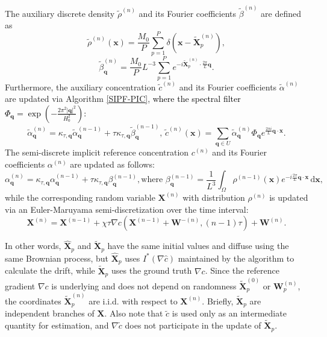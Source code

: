 \documentclass[review,onefignum,onetabnum]{siamart250211}
\begin{document}
\begin{definition}
The auxiliary discrete density \( \tilde{\rho}^{(n)} \) and its Fourier coefficients $\tilde{\beta}^{(n)}$ are defined as 
\begin{equation}
\tilde{\rho}^{(n)}(\mathbf{x}) = \frac{M_0}{P} \sum\limits_{p=1}^{P} \delta(\mathbf{x} - \widetilde{\mathbf{X}}_p^{(n)}),
\end{equation}
\begin{equation}
\tilde{\beta}_\mathbf{q}^{(n)} = \frac{M_0}{P} L^{-3} \sum_{p=1}^P e^{-i \widetilde{\mathbf{X}}_p^{(n)} \cdot \frac{2\pi}{L} \mathbf{q}}.
\end{equation}
Furthermore, the auxiliary concentration $\tilde{c}^{(n)}$ and its Fourier coefficients $\tilde{\alpha}^{(n)}$ are updated via Algorithm \ref{SIPF-PIC}, \textcolor{black}{where the spectral filter $\Phi_{\mathbf q}=\exp\left(-\frac{2\pi ^2|\mathbf q|^2}{H_0^2}\right)$:}
\begin{equation}
\label{eq:alpha_tilde_update}
\tilde{\alpha}^{(n)}_{\mathbf{q}} = \kappa_{\tau,\mathbf q} \tilde{\alpha}^{(n-1)}_{\mathbf{q}} + \tau \kappa_{\tau,\mathbf q} \tilde{\beta}^{(n-1)}_{\mathbf{q}},\,
\tilde{c}^{(n)} (\mathbf{x})  = \sum_{\mathbf{q} \in U}  \tilde{\alpha}_{\mathbf{q}}^{(n)} \Phi_{\mathbf q} e^{ \frac{2\pi i}{L} \mathbf{q} \cdot \mathbf{x}}.
\end{equation}
The semi-discrete implicit reference concentration $c^{(n)}$ and its Fourier coefficients $\alpha^{(n)}$ are updated as follows:
\begin{equation}
{\alpha}^{(n)}_{\mathbf{q}} = \kappa_{\tau,\mathbf q} {\alpha}^{(n-1)}_{\mathbf{q}} + \tau\kappa_{\tau,\mathbf q}{\beta}^{(n-1)}_{\mathbf{q}}, \text{where}\,\,
{\beta}_{\mathbf{q}}^{(n-1)} = \frac{1}{L^3} \int_{\Omega} {\rho}^{(n-1)}(\mathbf{x}) e^{-i \frac{2\pi}{L} \mathbf{q} \cdot \mathbf{x}} \, \mathrm{d}\mathbf{x},
\end{equation}
while the corresponding random variable \(\mathbf{X}^{(n)}\) with distribution \(\rho ^{(n)}\) is updated via an Euler-Maruyama semi-discretization over the time interval:
\begin{equation}
\mathbf{X}^{(n)} = \mathbf{X}^{(n-1)} + \chi \tau \nabla {c}(\mathbf{X}^{(n-1)}+ \mathbf{W}^{-(n)},(n-1)\tau) + \mathbf{W}^{(n)}.
\label{eq:rho_update}
\end{equation}
\end{definition}

In other words, \( \widehat{\mathbf{X}}_p \) and \( \widetilde{\mathbf{X}}_p \) have the same initial values and diffuse using the same Brownian process, but \( \widehat{\mathbf{X}}_p \) uses \( I^*(\nabla \hat{c}) \) maintained by the algorithm to calculate the drift, while \( \widetilde{\mathbf{X}}_p \) uses the ground truth \( \nabla c \). Since the reference gradient \( \nabla c \) is underlying and does not depend on randomness \(\widetilde{\mathbf{X}}_p^{(0)}\) or \(\mathbf{W}_p^{(n)}\), the coordinates \( \widetilde{\mathbf{X}}_p^{(n)} \) are i.i.d. with respect to \( \mathbf{X}^{(n)} \). Briefly, \( \widetilde{\mathbf{X}}_p \) are independent branches of \(\mathbf{X}\). Also note that $\tilde{c}$ is used only as an intermediate quantity for estimation, and $\nabla \tilde{c}$ does not participate in the update of $\widetilde{\mathbf{X}}_p$.
\end{document}
